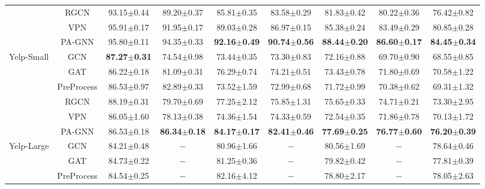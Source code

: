 \documentclass[sigconf]{acmart}
\newcommand{\our}{{PA-GNN}\xspace}
\begin{document}
\begin{table*}[!t]
\begin{tabular}{c|c|ccccccc}
                            & RGCN                 & 93.15$\pm$0.44 & 89.20$\pm$0.37 & 85.81$\pm$0.35 & 83.58$\pm$0.29 & 81.83$\pm$0.42 & 80.22$\pm$0.36 & 76.42$\pm$0.82 \\
                            & VPN              & 95.91$\pm$0.17 & 91.95$\pm$0.17 & 89.03$\pm$0.28 & 86.97$\pm$0.15 & 85.38$\pm$0.24 & 83.49$\pm$0.29 & 80.85$\pm$0.28 \\
                            & \our & 95.80$\pm$0.11 & 94.35$\pm$0.33 & \textbf{92.16$\pm$0.49} & \textbf{90.74$\pm$0.56} & \textbf{88.44$\pm$0.20} & \textbf{86.60$\pm$0.17} & \textbf{84.45$\pm$0.34} \\
                            \hline
\multirow{6}{*}{Yelp-Small} & GCN                  & \textbf{87.27$\pm$0.31} & 74.54$\pm$0.98 & 73.44$\pm$0.35 & 73.30$\pm$0.83 & 72.16$\pm$0.88 & 69.70$\pm$0.90 & 68.55$\pm$0.85 \\
                            & GAT                  & 86.22$\pm$0.18 & 81.09$\pm$0.31 & 76.29$\pm$0.74 & 74.21$\pm$0.51 & 73.43$\pm$0.78 & 71.80$\pm$0.69 & 70.58$\pm$1.22 \\
                            & PreProcess           & 86.53$\pm$0.97 & 82.89$\pm$0.33 & 73.52$\pm$1.59 & 72.99$\pm$0.68 & 71.72$\pm$0.99 & 70.38$\pm$0.62 & 69.31$\pm$1.32 \\
                            & RGCN                 & 88.19$\pm$0.31 & 79.70$\pm$0.69 & 77.25$\pm$2.12 & 75.85$\pm$1.31 & 75.65$\pm$0.33 & 74.71$\pm$0.21 & 73.30$\pm$2.95 \\
                            & VPN              & 86.05$\pm$1.60 & 78.13$\pm$0.38 & 74.36$\pm$1.54 & 74.33$\pm$0.59 & 72.54$\pm$0.35 & 71.86$\pm$0.78 & 70.13$\pm$1.72 \\
                            & \our & 86.53$\pm$0.18 & \textbf{86.34$\pm$0.18} & \textbf{84.17$\pm$0.17} & \textbf{82.41$\pm$0.46} & \textbf{77.69$\pm$0.25} & \textbf{76.77$\pm$0.60} & \textbf{76.20$\pm$0.39} \\
                            \hline
\multirow{6}{*}{Yelp-Large} & GCN                  & 84.21$\pm$0.48 & $-$            & 80.96$\pm$1.66 & $-$            & 80.56$\pm$1.69 & $-$            & 78.64$\pm$0.46 \\
                            & GAT                  & 84.73$\pm$0.22 & $-$            & 81.25$\pm$0.36 & $-$            & 79.82$\pm$0.42 & $-$            & 77.81$\pm$0.39 \\
                            & PreProcess           & 84.54$\pm$0.25 & $-$            & 82.16$\pm$4.12 & $-$            & 78.80$\pm$2.17 & $-$            & 78.05$\pm$2.63 \\

\end{tabular}
\end{table*}
\end{document}
